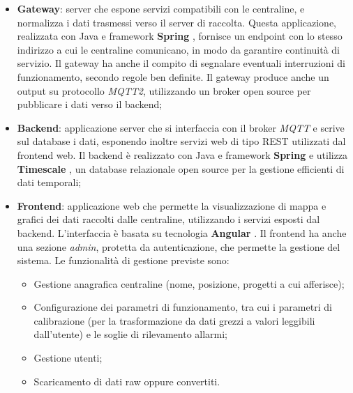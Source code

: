 \begin{itemize}
  \item \textbf{Gateway}: server che espone servizi compatibili con le centraline, e normalizza i dati trasmessi verso il server di raccolta. Questa applicazione, realizzata con Java e framework \textbf{Spring} \cite{spring}, fornisce un endpoint con lo stesso indirizzo a cui le centraline comunicano, in modo da garantire continuità di servizio. Il gateway ha anche il compito di segnalare eventuali interruzioni di funzionamento, secondo regole ben definite. Il gateway produce anche un output su protocollo \textit{MQTT2}, utilizzando un broker open source per pubblicare i dati verso il backend;
  \item \textbf{Backend}: applicazione server che si interfaccia con il broker \textit{MQTT} e scrive sul database i dati, esponendo inoltre servizi web di tipo REST utilizzati dal frontend web. Il backend è realizzato con Java e framework \textbf{Spring} \cite{spring} e utilizza \textbf{Timescale} \cite{timescale}, un database relazionale open source per la gestione efficienti di dati temporali;
  \item \textbf{Frontend}: applicazione web che permette la visualizzazione di mappa e grafici dei dati raccolti dalle centraline, utilizzando i servizi esposti dal backend. L'interfaccia è basata su tecnologia \textbf{Angular} \cite{angular}. Il frontend ha anche una sezione \textit{admin}, protetta da autenticazione, che permette la gestione del sistema. Le funzionalità di gestione previste sono:
    \begin{itemize}
      \item Gestione anagrafica centraline (nome, posizione, progetti a cui afferisce);
      \item Configurazione dei parametri di funzionamento, tra cui i parametri di calibrazione (per la trasformazione da dati grezzi a valori leggibili dall’utente) e le soglie di rilevamento allarmi;
      \item Gestione utenti;
      \item Scaricamento di dati raw oppure convertiti. \cite{airqino}
    \end{itemize}
\end{itemize}

